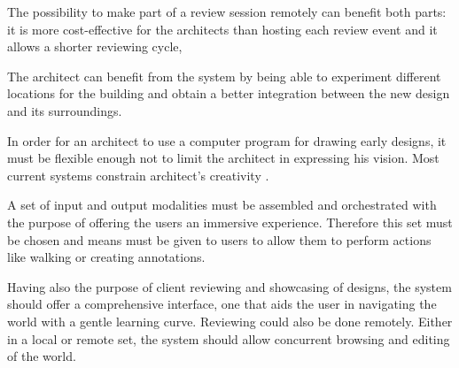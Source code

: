 
The possibility to make part of a review session remotely can benefit both parts:
it is more cost-effective for the architects than hosting each review event and
it allows a shorter reviewing cycle, 

The architect can benefit from the system by being able to experiment different locations
for the building and obtain a better integration between the new design and its surroundings.

In order for an architect to use a computer program for drawing early designs,
it must be flexible enough not to limit the architect in expressing his vision.
Most current systems constrain architect's creativity \cite{TOW3D}.




A set of input and output modalities must be assembled and orchestrated
with the purpose of offering the users an immersive experience.
Therefore this set must be chosen and means must be given to users
to allow them to perform actions like walking or creating annotations.

Having also the purpose of client reviewing and showcasing of designs,
the system should offer a comprehensive interface,
one that aids the user in navigating the world with a gentle learning curve.
Reviewing could also be done remotely.
Either in a local or remote set, the system should allow
concurrent browsing and editing of the world.


